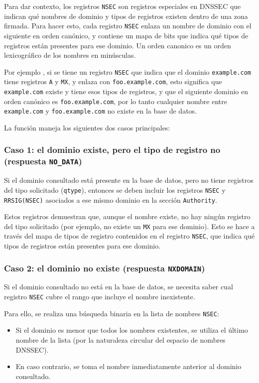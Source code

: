 Para dar contexto, los registros \texttt{NSEC} son registros especiales en DNSSEC que indican qué nombres de dominio y tipos de registros existen dentro de una zona firmada.
Para hacer esto, cada registro \texttt{NSEC} enlaza un nombre de dominio con el siguiente en orden canónico, y contiene un mapa de bits que indica qué tipos de registros están presentes para ese dominio.
Un orden canonico es un orden lexicográfico de los nombres en minúsculas.

Por ejemplo , si se tiene un registro \texttt{NSEC} que indica que el dominio \texttt{example.com} tiene registros \texttt{A} y \texttt{MX}, y enlaza con \texttt{foo.example.com},
esto significa que \texttt{example.com} existe y tiene esos tipos de registros, y que el siguiente dominio en orden canónico es \texttt{foo.example.com}, por lo tanto cualquier nombre entre 
\texttt{example.com} y \texttt{foo.example.com} no existe en la base de datos.

La función maneja los siguientes dos casos principales:

\subsubsection{Caso 1: el dominio existe, pero el tipo de registro no (respuesta \texttt{NO\_DATA})}
Si el dominio consultado está presente en la base de datos, pero no tiene registros del tipo solicitado (\texttt{qtype}),
entonces se deben incluir los registros \texttt{NSEC} y \texttt{RRSIG(NSEC)} asociados a ese mismo dominio en la sección \texttt{Authority}.

Estos registros demuestran que, aunque el nombre existe, no hay ningún registro del tipo solicitado (por ejemplo, no existe un \texttt{MX} para ese dominio).
Esto se hace a través del mapa de tipos de registro contenidos en el registro \texttt{NSEC}, que indica qué tipos de registros están presentes para ese dominio.


\subsubsection{Caso 2: el dominio no existe (respuesta \texttt{NXDOMAIN})}

Si el dominio consultado no está en la base de datos, se necesita saber cual registro \texttt{NSEC} cubre el rango que incluye el nombre inexistente.

Para ello, se realiza una búsqueda binaria en la lista de nombres \texttt{NSEC}:

\begin{itemize}
    \item Si el dominio es menor que todos los nombres existentes, se utiliza el último nombre de la lista (por la naturaleza circular del espacio de nombres DNSSEC).
    \item En caso contrario, se toma el nombre inmediatamente anterior al dominio consultado.
\end{itemize}

